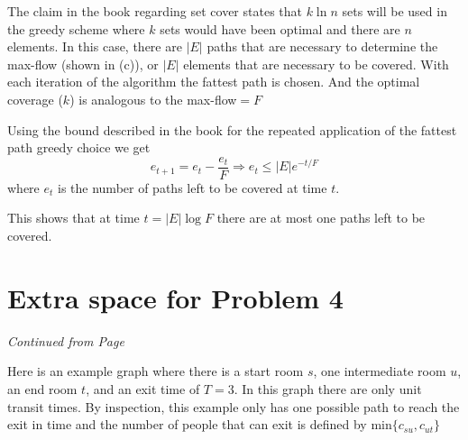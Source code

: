 \documentclass[11pt]{article}
\begin{document}
\begin{itemize}
  The claim in the book regarding set cover
  states that $k\ln n$ sets will be used in the greedy scheme where $k$ sets
  would have been optimal and there are $n$ elements. 
  In this case, there are $|E|$ paths that are necessary to determine the max-flow 
  (shown in (c)), or $|E|$ elements that are necessary to be covered. With each
  iteration of the algorithm the fattest path is chosen. And the optimal 
  coverage ($k$) is analogous to the max-flow$=F$

  Using the bound described in the book for the repeated application of the 
  fattest path greedy choice we get 
  $$ e_{t+1} = e_t - \frac{e_t}{F} \Rightarrow e_t \leq |E|e^{-t/F} $$
  where $e_t$ is the number of paths left to be covered at time $t$.
  
  This shows that at time $t=|E|\log F$ there are at most one paths left to be covered.
  
\end{itemize}

\newpage
 
\section*{Extra space for Problem 4}
\emph{Continued from Page \pageref{pg:end-of-p4}}

Here is an example graph where there is a start room $s$, one intermediate room
$u$, an end room $t$, and an exit time of $T=3$. In this graph there are only 
unit transit times. By inspection, this example only has one possible path to
reach the exit in time and the number of people that can exit is defined by 
$\mbox{min}\{c_{su},c_{ut}\}$

{
\centering
{}\par
}
\end{document}
